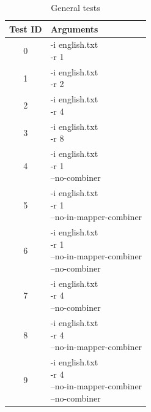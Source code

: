 \documentclass{article}
\begin{document}
\begin{multicols}{2}
\begin{table}[H]
    \centering
    \begin{tabular}{|c|l|}
        \hline
        Test ID & Arguments \\
        \hline
        0 & \makecell[l]{-i english.txt \\ -r 1} \\        
        \hline
        1 & \makecell[l]{-i english.txt \\ -r 2} \\        
        \hline
        2 & \makecell[l]{-i english.txt \\ -r 4} \\        
        \hline
        3 & \makecell[l]{-i english.txt \\ -r 8} \\        
        \hline
        4 & \makecell[l]{-i english.txt \\ -r 1 \\ --no-combiner} \\        
        \hline
        5 & \makecell[l]{-i english.txt \\ -r 1 \\ --no-in-mapper-combiner} \\        
        \hline
        6 & \makecell[l]{-i english.txt \\ -r 1 \\ --no-in-mapper-combiner \\ --no-combiner} \\        
        \hline
        7 & \makecell[l]{-i english.txt \\ -r 4 \\ --no-combiner} \\        
        \hline
        8 & \makecell[l]{-i english.txt \\ -r 4 \\ --no-in-mapper-combiner} \\        
        \hline
        9 & \makecell[l]{-i english.txt \\ -r 4 \\ --no-in-mapper-combiner \\ --no-combiner} \\        
        \hline
    \end{tabular}
    \caption{General tests}
    \label{tab:general_tests}
\end{table}
\begin{table}[H]
    \centering
    \begin{tabular}{|c|l|}
        \hline

\end{tabular}
\end{table}
\end{multicols}
\end{document}
